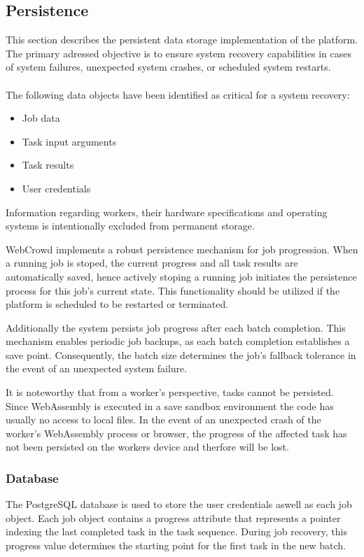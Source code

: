 \subsection{Persistence}
\label{subsec:implementation:architecture:persistence}
This section describes the persistent data storage implementation of the platform. The primary adressed objective is to ensure system recovery capabilities in cases of system failures, unexpected system crashes, or scheduled system restarts.
\\~\\
The following data objects have been identified as critical for a system recovery:
\begin{itemize}
    \item Job data
    \item Task input arguments
    \item Task results
    \item User credentials
\end{itemize}
Information regarding workers, their hardware specifications and operating systems is intentionally excluded from permanent storage.

WebCrowd implements a robust persistence mechanism for job progression. When a running job is stoped, the current progress and all task results are automatically saved, hence actively stoping a running job initiates the persistence process for this job's current state. This functionality should be utilized if the platform is scheduled to be restarted or terminated.

Additionally the system persists job progress after each batch completion. This mechanism enables periodic job backups, as each batch completion establishes a save point. Consequently, the batch size determines the job's fallback tolerance in the event of an unexpected system failure.

It is noteworthy that from a worker's perspective, tasks cannot be persisted. Since WebAssembly is executed in a save sandbox environment the code has usually no access to local files. In the event of an unexpected crash of the worker's WebAssembly process or browser, the progress of the affected task has not been persisted on the workers device and therfore will be lost.

\subsubsection{Database}
The PostgreSQL database is used to store the user credentials aswell as each job object. Each job object contains a progress attribute that represents a pointer indexing the last completed task in the task sequence. During job recovery, this progress value determines the starting point for the first task in the new batch.

